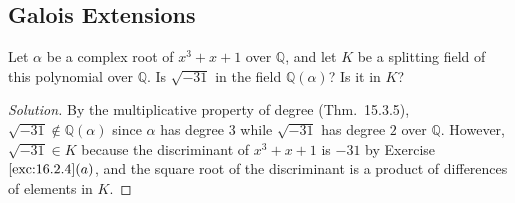 \documentclass[12pt]{article}
\theoremstyle{remark}
\begin{document}
\subsection{Galois Extensions}
\begin{problem}
  Let $\alpha$ be a complex root of $x^3 + x + 1$ over $\mathbb{Q}$, and let $K$ be a splitting field of this polynomial over $\mathbb{Q}$. Is $\sqrt{-31}$ in the field $\mathbb{Q} (\alpha)$? Is it in $K$?
\end{problem}
\begin{proof}[Solution]
  By the multiplicative property of degree (Thm.~15.3.5), $\sqrt{-31} \notin \mathbb{Q}(\alpha)$ since $\alpha$ has degree $3$ while $\sqrt{-31}$ has degree $2$ over $\mathbb{Q}$. However, $\sqrt{-31} \in K$ because the discriminant of $x^3 + x + 1$ is $-31$ by Exercise $\ref{exc:16.2.4}(a)$, and the square root of the discriminant is a product of differences of elements in $K$.
\end{proof}
\end{document}
